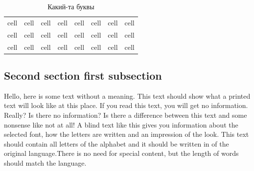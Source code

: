 \documentclass[a4paper,14pt]{extarticle}
\begin{document}
    \begin{table}[H]
            
        \caption{Какий-та буквы}
        \noindent\begin{tabular}{|c|c|c|c|c|c|c|c|}
            \hline
            cell & cell & cell & cell & cell & cell & cell & cell \\
            cell & cell & cell & cell & cell & cell & cell & cell \\
            cell & cell & cell & cell & cell & cell & cell & cell \\
            \hline
            
        \end{tabular}

    \end{table}

    \subsection{Second section first subsection}

    Hello, here is some text without a meaning.  This text should show what 
    a printed text will look like at this place.  If you read this text, 
    you will get no information.  Really?  Is there no information?  Is there 
    a difference between this text and some nonsense like not at all!  A 
    blind text like this gives you information about the selected font, how 
    the letters are written and an impression of the look.  This text should
    contain all letters of the alphabet and it should be written in of the
    original language.There is no need for special content, but the length of
    words should match the language.
\end{document}
